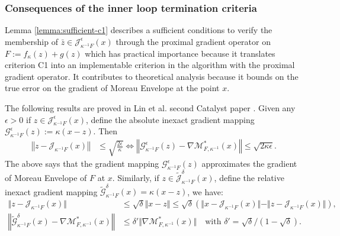 \documentclass[12pt]{article}
\begin{document}
        \subsubsection{Consequences of the inner loop termination criteria}
            Lemma \ref{lemma:sufficient-c1} describes a sufficient conditions to verify the membership of $\bar z \in \mathcal J_{\kappa^{-1}F}^\epsilon (x)$ through the proximal gradient operator on $F:= f_\kappa(z) + g(z)$ which has practical importance because it translates criterion C1 into an implementable criterion in the algorithm with the proximal gradient operator. 
            It contributes to theoretical analysis because it bounds on the true error on the gradient of Moreau Envelope at the point $x$. 
            \par 
            The following results are proved in Lin et al. second Catalyst paper \cite{lin_catalyst_2018}. 
            Given any $\epsilon > 0$ if $z \in \mathcal J_{\kappa^{-1}F}^\epsilon (x)$, define the absolute inexact gradient mapping $\mathcal G_{\kappa^{-1}F}^\epsilon (z) := \kappa(x - z)$.
            Then
            \begin{align*}
                \left\Vert z - \mathcal J_{\kappa^{-1}F} (x)\right\Vert
                &\le \sqrt{\frac{2\epsilon}{\kappa}} 
                \iff 
                \left\Vert
                    \mathcal G_{\kappa^{-1}F}^\epsilon(z) 
                    - \nabla \mathcal M_{F, \kappa^{-1}}^*(x)
                \right\Vert 
                \le \sqrt{2\kappa\epsilon}. 
            \end{align*}
            The above says that the gradient mapping $\mathcal G_{\kappa^{-1}F}^{\epsilon}(z)$ approximates the gradient of Moreau Envelope of $F$ at $x$. 
            Similarly, if $z \in \widetilde{\mathcal J}_{\kappa^{-1}F}^\delta(x)$, define the relative inexact gradient mapping $\widetilde{\mathcal G}_{\kappa^{-1}F}^\delta(x) = \kappa(x - z)$, we have: 
            \begin{align*}
                \Vert z - \mathcal J_{\kappa^{-1}F}(x)\Vert 
                &\le \sqrt{\delta}\Vert x - z\Vert 
                \le \sqrt{\delta}(
                    \Vert x - \mathcal J_{\kappa^{-1}F} (x) \Vert 
                    - \Vert z - \mathcal J_{\kappa^{-1}F} (x) \Vert
                ), 
                \\
                \left\Vert 
                    \widetilde{\mathcal G}_{\kappa^{-1}F}^\delta(x) - 
                    \nabla \mathcal M^*_{F, \kappa^{-1}}(x) 
                \right\Vert
                &\le 
                \delta' \Vert \nabla \mathcal M^*_{F, \kappa^{-1}}(x) \Vert \quad 
                \text{with } \delta' = \sqrt{\delta}/\left(1 - \sqrt{\delta}\right). 
            \end{align*}
\end{document}

